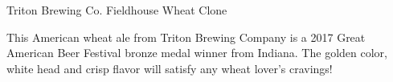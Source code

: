 \begin{recipie}{Triton Brewing Co. Fieldhouse Wheat Clone}

\begin{aboutblock}
This American wheat ale from Triton Brewing Company is a 2017 Great American
Beer Festival bronze medal winner from Indiana. The golden color, white head
and crisp flavor will satisfy any wheat lover's cravings! \sourceaha
\end{aboutblock}


\begin{methodandtiming}
 
\begin{mashsteps}
\end{mashsteps}

\begin{fermentationsteps}
\end{fermentationsteps}

\end{methodandtiming}

\pagebreak

\begin{ingredientsblock}

\begin{malts}
\end{malts}

\begin{hops}
\end{hops}


\end{ingredientsblock}

\end{recipie}

